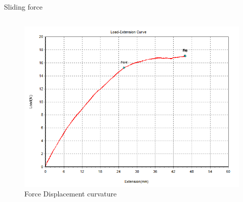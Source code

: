 \documentclass[10pt]{beamer} %
\begin{document}
\begin{frame}[fragile]{Sliding force}
\begin{columns}[T,onlytextwidth]
\begin{figure}
	\includegraphics[scale=0.5]{Test1ChestHold}
	\caption{Force Displacement curvature}
	\end{figure}
\end{columns}
\end{frame}
\end{document}
